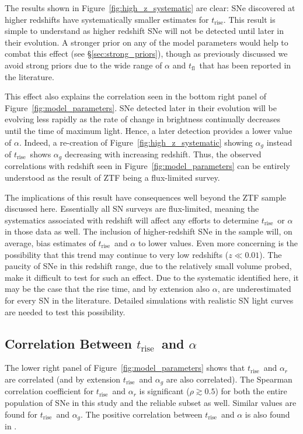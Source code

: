 \documentclass[twocolumn]{./aastex63}
\newcommand{\tfl}{$t_\mathrm{fl}$}
\newcommand{\trise}{$t_\mathrm{rise}$}
\begin{document}
The results shown in Figure~\ref{fig:high_z_systematic} are clear: SNe
discovered at higher redshifts have systematically smaller estimates for
\trise. This result is simple to understand as higher redshift SNe will not be
detected until later in their evolution. A stronger prior on any of the model
parameters would help to combat this effect (see \S\ref{sec:strong_priors}),
though as previously discussed we avoid strong priors due to the wide range of
$\alpha$ and \tfl\ that has been reported in the literature. 

This effect also explains the correlation seen in the bottom right panel of
Figure~\ref{fig:model_parameters}. SNe detected later in their evolution will
be evolving less rapidly as the rate of change in brightness continually
decreases until the time of maximum light. Hence, a later detection provides a
lower value of $\alpha$. Indeed, a re-creation of
Figure~\ref{fig:high_z_systematic} showing $\alpha_g$ instead of \trise\ shows
$\alpha_g$ decreasing with increasing redshift. Thus, the observed
correlations with redshift seen in Figure~\ref{fig:model_parameters} can be
entirely understood as the result of ZTF being a flux-limited survey.

The implications of this result have consequences well beyond the ZTF sample
discussed here. Essentially all SN surveys are flux-limited, meaning the
systematics associated with redshift will affect any efforts to determine
\trise\ or $\alpha$ in those data as well. The inclusion of higher-redshift
SNe in the sample will, on average, bias estimates of \trise\ and $\alpha$ to
lower values. Even more concerning is the possibility that this trend may
continue to very low redshifts ($z \ll 0.01$). The paucity of SNe in this
redshift range, due to the relatively small volume probed, make it difficult
to test for such an effect. Due to the systematic identified here, it may be
the case that the rise time, and by extension also $\alpha$, are
underestimated for every SN in the literature. Detailed simulations with
realistic SN light curves are needed to test this possibility.

\subsection{Correlation Between \trise\ and $\alpha$}

The lower right panel of Figure~\ref{fig:model_parameters} shows that \trise\
and $\alpha_r$ are correlated (and by extension \trise\ and $\alpha_g$ are
also correlated). The Spearman correlation coefficient for \trise\ and
$\alpha_r$ is significant ($\rho \gtrsim 0.5$) for both the entire population
of SNe in this study and the reliable subset as well. Similar values are found
for \trise\ and $\alpha_g$. The positive correlation between \trise\ and
$\alpha$ is also found in \citet{Gonzalez-Gaitan12}.
\end{document}
